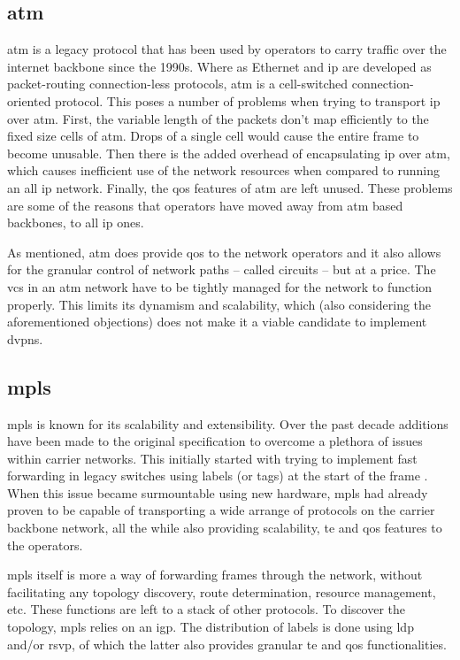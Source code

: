 \subsection{\acs{atm}} %
\label{sub:atm}
\ac{atm} is a legacy protocol that has been used by operators to carry traffic over the internet backbone since the 1990s. Where as Ethernet and \ac{ip} are developed as packet-routing connection-less protocols, \ac{atm} is a cell-switched connection-oriented protocol. This poses a number of problems when trying to transport \ac{ip} over \ac{atm}. First, the variable length of the packets don't map efficiently to the fixed size cells of \ac{atm}. Drops of a single cell would cause the entire frame to become unusable. Then there is the added overhead of encapsulating \ac{ip} over \ac{atm}, which causes inefficient use of the network resources when compared to running an all \ac{ip} network. Finally, the \ac{qos} features of \ac{atm} are left unused. These problems are some of the reasons that operators have moved away from \ac{atm} based backbones, to all \ac{ip} ones. 

As mentioned, \ac{atm} does provide \ac{qos} to the network operators and it also allows for the granular control of network paths -- called circuits -- but at a price. The \acp{vc} in an \ac{atm} network have to be tightly managed for the network to function properly. This limits its dynamism and scalability, which (also considering the aforementioned objections) does not make it a viable candidate to implement \acp{dvpn}.


\subsection{\acs{mpls}} %
\label{sub:mpls}
\ac{mpls} is known for its scalability and extensibility. Over the past decade additions have been made to the original specification to overcome a plethora of issues within carrier networks. This initially started with trying to implement fast forwarding in legacy switches using labels (or tags) at the start of the frame \cite{tag-switching}. When this issue became surmountable using new hardware, \ac{mpls} had already proven to be capable of transporting a wide arrange of protocols on the carrier backbone network, all the while also providing scalability, \ac{te} and \ac{qos} features to the operators.

\ac{mpls} itself is more a way of forwarding frames through the network, without facilitating any topology discovery, route determination, resource management, etc. These functions are left to a stack of other protocols. To discover the topology, \ac{mpls} relies on an \ac{igp}. The distribution of labels is done using \ac{ldp} and/or \ac{rsvp}, of which the latter also provides granular \ac{te} and \ac{qos} functionalities.


